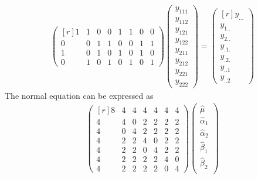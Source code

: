 \documentclass[12pt]{article} %
\begin{document}
\begin{enumerate}
\begin{itemize}
\begin{itemize}
\begin{eqnarray*}
\begin{pmatrix}[r]
			    1 &   1 &   0 &   0 &   1 &   1 &   0 &   0 \\
			    0 &   0 &   1 &   1 &   0 &   0 &   1 &   1 \\
			    1 &   0 &   1 &   0 &   1 &   0 &   1 &   0 \\
			    0 &   1 &   0 &   1 &   0 &   1 &   0 &   1
			\end{pmatrix}
			\begin{pmatrix}
			y_{111} \\
			y_{112} \\
			y_{121} \\
			y_{122} \\
			y_{211} \\
			y_{212} \\
			y_{221} \\
			y_{222} 
			\end{pmatrix}=
			\begin{pmatrix}[r]
			y_{...} \\
			y_{1..} \\
			y_{2..} \\
			y_{.1.} \\
			y_{.2.} \\
			y_{..1} \\
			y_{..2} 			
			\end{pmatrix}									 		     
		    \end{eqnarray*}
		    The normal equation can be expressed as
		    \begin{eqnarray*}
			\begin{pmatrix}[r]
			    8 &   4 &   4 &   4 &   4 &   4 &   4 \\
			    4 &   4 &   0 &   2 &   2 &   2 &   2 \\
			    4 &   0 &   4 &   2 &   2 &   2 &   2 \\
			    4 &   2 &   2 &   4 &   0 &   2 &   2 \\
			    4 &   2 &   2 &   0 &   4 &   2 &   2 \\
			    4 &   2 &   2 &   2 &   2 &   4 &   0 \\
			    4 &   2 &   2 &   2 &   2 &   0 &   4
			\end{pmatrix}
			\begin{pmatrix}
			\hat{\mu} \\
			\hat{\alpha}_{1} \\
			\hat{\alpha}_{2} \\
			\hat{\beta}_{1} \\
			\hat{\beta}_{2} \\

\end{pmatrix}
\end{eqnarray*}
\end{itemize}
\end{itemize}
\end{enumerate}
\end{document}

